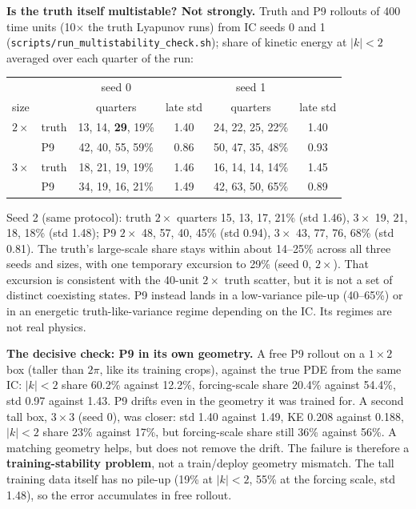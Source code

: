 \documentclass[11pt]{article}
\begin{document}
\textbf{Is the truth itself multistable? Not strongly.} Truth and P9
rollouts of 400 time units (10$\times$ the truth Lyapunov runs) from IC
seeds 0 and 1 (\texttt{scripts/run\_multistability\_check.sh}); share of
kinetic energy at $|k|<2$ averaged over each quarter of the run:
\begin{center}
\small
\begin{tabular}{llcccc}
\toprule
 & & seed 0 & & seed 1 & \\
size & & quarters & late std & quarters & late std \\
\midrule
$2\times$ & truth & 13, 14, \textbf{29}, 19\% & 1.40 & 24, 22, 25, 22\% & 1.40 \\
 & P9 & 42, 40, 55, 59\% & 0.86 & 50, 47, 35, 48\% & 0.93 \\
$3\times$ & truth & 18, 21, 19, 19\% & 1.46 & 16, 14, 14, 14\% & 1.45 \\
 & P9 & 34, 19, 16, 21\% & 1.49 & 42, 63, 50, 65\% & 0.89 \\
\bottomrule
\end{tabular}
\end{center}
Seed 2 (same protocol): truth $2\times$ quarters 15, 13, 17, 21\% (std
1.46), $3\times$ 19, 21, 18, 18\% (std 1.48); P9 $2\times$ 48, 57, 40,
45\% (std 0.94), $3\times$ 43, 77, 76, 68\% (std 0.81).
The truth's large-scale share stays within about 14--25\% across all three seeds
and sizes, with one temporary excursion to 29\% (seed 0, $2\times$). That
excursion is consistent with the 40-unit $2\times$ truth scatter, but
it is not a set of distinct coexisting states. P9 instead lands in a
low-variance pile-up (40--65\%) or in an energetic truth-like-variance
regime depending on the IC. Its regimes are not real physics.

\textbf{The decisive check: P9 in its own geometry.} A free P9 rollout on
a $1\times2$ box (taller than $2\pi$, like its training crops), against
the true PDE from the same IC: $|k|<2$ share 60.2\% against 12.2\%,
forcing-scale share 20.4\% against 54.4\%, std 0.97 against 1.43. P9
drifts even in the geometry it was trained for. A second tall box,
$3\times3$ (seed 0), was closer: std 1.40 against 1.49, KE 0.208 against
0.188, $|k|<2$ share 23\% against 17\%, but forcing-scale share still
36\% against 56\%. A matching geometry helps, but does not remove the
drift. The failure is therefore
a \textbf{training-stability problem}, not a train/deploy geometry
mismatch. The tall training data itself has no pile-up (19\% at $|k|<2$,
55\% at the forcing scale, std 1.48), so the error accumulates in free
rollout.
\end{document}
